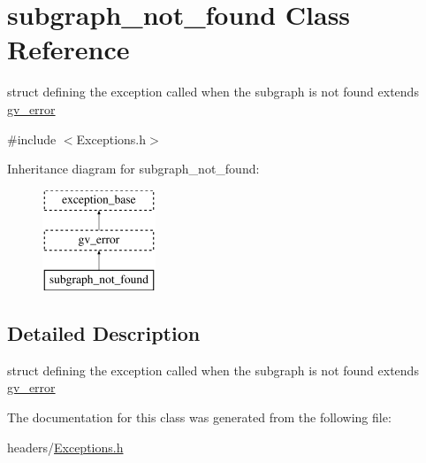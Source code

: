 \hypertarget{structsubgraph__not__found}{\section{subgraph\-\_\-not\-\_\-found \-Class \-Reference}
\label{structsubgraph__not__found}
}


struct defining the exception called when the subgraph is not found extends \hyperlink{structgv__error}{gv\-\_\-error}  




{\ttfamily \#include $<$\-Exceptions.\-h$>$}

\-Inheritance diagram for subgraph\-\_\-not\-\_\-found\-:\begin{figure}[H]
\begin{center}
\leavevmode
\includegraphics[height=3.000000cm]{structsubgraph__not__found}
\end{center}
\end{figure}


\subsection{\-Detailed \-Description}
struct defining the exception called when the subgraph is not found extends \hyperlink{structgv__error}{gv\-\_\-error} 

\-The documentation for this class was generated from the following file\-:\begin{DoxyCompactItemize}
\item 
headers/\hyperlink{_exceptions_8h}{\-Exceptions.\-h}\end{DoxyCompactItemize}
